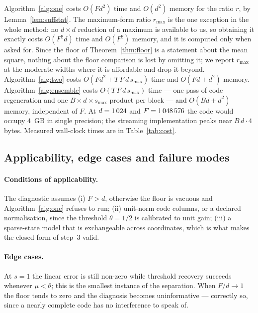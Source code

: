 \documentclass[preprint,12pt]{elsarticle}
\theoremstyle{definition}
\begin{document}
Algorithm~\ref{alg:one} costs $O(Fd^2)$ time and $O(d^2)$ memory for the ratio $r$, by
Lemma~\ref{lem:suffstat}. The maximum-form ratio $r_{\max}$ is the one exception in the whole
method: no $d\times d$ reduction of a maximum is available to us, so obtaining it exactly costs
$O(F^2d)$ time and $O(F^2)$ memory, and it is computed only when asked for. Since the floor of
Theorem~\ref{thm:floor} is a statement about the mean square, nothing about the floor
comparison is lost by omitting it; we report $r_{\max}$ at the moderate widths where it is
affordable and drop it beyond. Algorithm~\ref{alg:two} costs $O(Fd^2+T\,F\,d\,s_{\max})$ time
and $O(Fd+d^2)$ memory. Algorithm~\ref{alg:ensemble} costs $O(T\,F\,d\,
s_{\max})$ time --- one pass of code regeneration and one $B\times d\times s_{\max}$ product
per block --- and $O(Bd+d^2)$ memory, independent of $F$. At $d=1\,024$ and
$F=1\,048\,576$ the code would occupy $4$~GB in single precision; the streaming implementation
peaks near $B\,d\cdot4$ bytes. Measured wall-clock times are in Table~\ref{tab:cost}.

\subsection{Applicability, edge cases and failure modes}

\paragraph{Conditions of applicability.} The diagnostic assumes (i) $F>d$, otherwise the floor
is vacuous and Algorithm~\ref{alg:one} refuses to run; (ii) unit-norm code columns, or a
declared normalisation, since the threshold $\theta=1/2$ is calibrated to unit gain;
(iii) a sparse-state model that is exchangeable across coordinates, which is what makes the
closed form of step~3 valid.

\paragraph{Edge cases.} At $s=1$ the linear error is still non-zero while threshold recovery
succeeds whenever $\mu<\theta$; this is the smallest instance of the separation. When
$F/d\to1$ the floor tends to zero and the diagnosis becomes uninformative --- correctly so,
since a nearly complete code has no interference to speak of.
\end{document}
